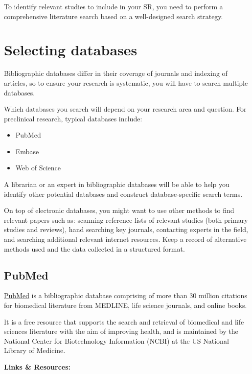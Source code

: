 \documentclass[
]{book}
\begin{document}
To identify relevant studies to include in your SR, you need to perform a comprehensive literature search based on a well-designed search strategy.

\section{Selecting databases}\label{selecting-databases}

Bibliographic databases differ in their coverage of journals and indexing of articles, so to ensure your research is systematic, you will have to search multiple databases.

Which databases you search will depend on your research area and question. For preclinical research, typical databases include:

\begin{itemize}
\item
  PubMed
\item
  Embase
\item
  Web of Science
\end{itemize}

A librarian or an expert in bibliographic databases will be able to help you identify other potential databases and construct database-specific search terms.

On top of electronic databases, you might want to use other methods to find relevant papers such as: scanning reference lists of relevant studies (both primary studies and reviews), hand searching key journals, contacting experts in the field, and searching additional relevant internet resources. Keep a record of alternative methods used and the data collected in a structured format.

\subsection{PubMed}\label{pubmed}

\href{https://pubmed.ncbi.nlm.nih.gov/}{PubMed} is a bibliographic database comprising of more than 30 million citations for biomedical literature from MEDLINE, life science journals, and online books.

It is a free resource that supports the search and retrieval of biomedical and life sciences literature with the aim of improving health, and is maintained by the National Center for Biotechnology Information (NCBI) at the US National Library of Medicine.

\textbf{Links \& Resources:}
\end{document}
